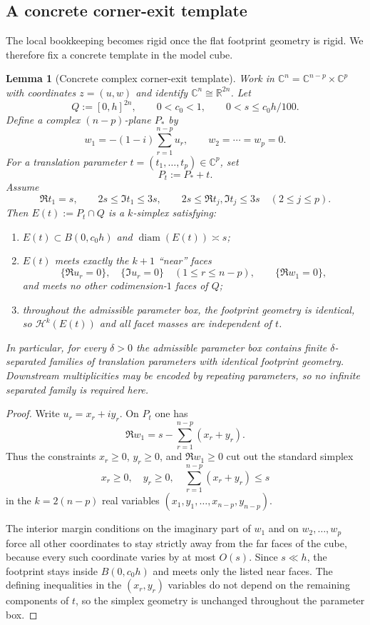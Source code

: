 \documentclass[11pt]{article}
\numberwithin{equation}{section}
\theoremstyle{plain}
\newtheorem{lemma}[theorem]{Lemma}
\theoremstyle{definition}
\theoremstyle{remark}
\DeclareMathOperator{\diam}{diam}
\newcommand{\R}{\mathbb{R}}
\newcommand{\C}{\mathbb{C}}
\newcommand{\calH}{\mathcal{H}}
\begin{document}
\subsection{A concrete corner-exit template}

The local bookkeeping becomes rigid once the flat footprint geometry is rigid.  We therefore fix a concrete template in the model cube.

\begin{lemma}[Concrete complex corner-exit template]\label{lem:corner}
Work in $\C^n=\C^{n-p}\times\C^p$ with coordinates $z=(u,w)$ and identify $\C^n \cong \R^{2n}$.  Let
\[
Q:=[0,h]^{2n},
\qquad
0<c_0<1,
\qquad
0<s\le c_0 h/100.
\]
Define a complex $(n-p)$-plane $P_\ast$ by
\[
w_1 = -(1-i)\sum_{r=1}^{n-p} u_r,
\qquad
w_2=\cdots=w_p=0.
\]
For a translation parameter $t=(t_1,\dots,t_p)\in\C^p$, set
\[
P_t := P_\ast + t.
\]
Assume
\[
\Re t_1=s,
\qquad
2s \le \Im t_1 \le 3s,
\qquad
2s \le \Re t_j,\Im t_j \le 3s
\quad (2\le j \le p).
\]
Then $E(t):=P_t\cap Q$ is a $k$-simplex satisfying:
\begin{enumerate}
\item[\textnormal{(i)}] $E(t)\subset B(0,c_0h)$ and $\diam(E(t))\asymp s$;
\item[\textnormal{(ii)}] $E(t)$ meets exactly the $k+1$ ``near'' faces
\[
\{\Re u_r=0\},
\quad
\{\Im u_r=0\}
\quad (1\le r\le n-p),
\qquad
\{\Re w_1=0\},
\]
and meets no other codimension-$1$ faces of $Q$;
\item[\textnormal{(iii)}] throughout the admissible parameter box, the footprint geometry is identical, so $\calH^k(E(t))$ and all facet masses are independent of $t$.
\end{enumerate}
In particular, for every $\delta>0$ the admissible parameter box contains finite
$\delta$-separated families of translation parameters with identical footprint
geometry.  Downstream multiplicities may be encoded by repeating parameters, so
no infinite separated family is required here.
\end{lemma}

\begin{proof}
Write $u_r=x_r+iy_r$.  On $P_t$ one has
\[
\Re w_1
=
s-\sum_{r=1}^{n-p}(x_r+y_r).
\]
Thus the constraints $x_r\ge 0$, $y_r\ge 0$, and $\Re w_1\ge 0$ cut out the standard simplex
\[
x_r\ge 0,\quad y_r\ge 0,\quad \sum_{r=1}^{n-p}(x_r+y_r)\le s
\]
in the $k=2(n-p)$ real variables $(x_1,y_1,\dots,x_{n-p},y_{n-p})$.

The interior margin conditions on the imaginary part of $w_1$ and on $w_2,\dots,w_p$ force all other coordinates to stay strictly away from the far faces of the cube, because every such coordinate varies by at most $O(s)$.  Since $s\ll h$, the footprint stays inside $B(0,c_0h)$ and meets only the listed near faces.  The defining inequalities in the $(x_r,y_r)$ variables do not depend on the remaining components of $t$, so the simplex geometry is unchanged throughout the parameter box.
\end{proof}
\end{document}
